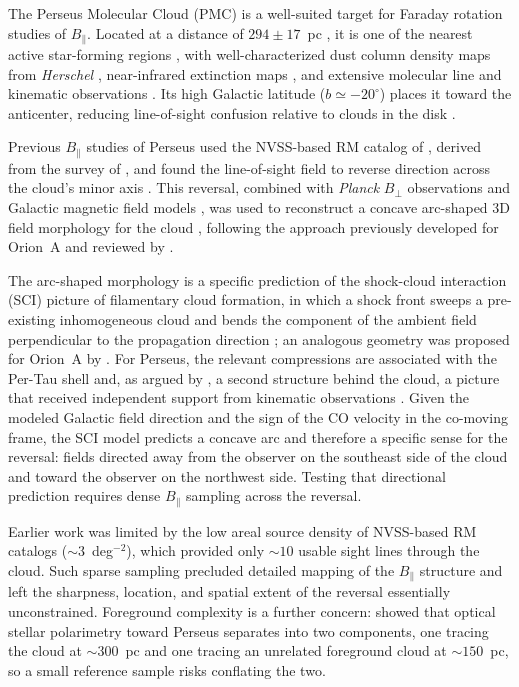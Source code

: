 \documentclass[twocolumn]{aastex701}
\begin{document}
The Perseus Molecular Cloud (PMC) is a well-suited target for Faraday
rotation studies of $B_\parallel$. Located at a distance of $294 \pm 17$~pc
\citep{zucker2018}, it is one of the nearest active star-forming regions
\citep{enoch2006bolocam,hatchell2007star,tobin2016vla}, with
well-characterized dust column density maps from \textit{Herschel}
\citep{andre2010}, near-infrared extinction maps
\citep{kainulainen2009,lombardi2009nicest}, and extensive molecular line and
kinematic observations
\citep{ridge2006complete,curtis2010submillimetre,chen2024filament,scibelli2024survey}.
Its high Galactic latitude ($b \simeq -20^\circ$) places it toward the
anticenter, reducing line-of-sight confusion relative to clouds in the disk
\citep{tahani2022b}.

Previous $B_\parallel$ studies of Perseus used the NVSS-based RM catalog of
\citet{taylor2009}, derived from the survey of \citet{condon1998nrao}, and
found the line-of-sight field to reverse direction across the cloud's minor
axis \citep{tahani2018}. This reversal, combined with \textit{Planck}
$B_\perp$ observations \citep{planck2016} and Galactic magnetic field models
\citep{jansson2012new}, was used to reconstruct a concave arc-shaped 3D field
morphology for the cloud \citep{tahani2022b}, following the approach
previously developed for Orion~A
\citep{tahani2019could,tahani2022orion} and reviewed by
\citet{tahani2022three}.

The arc-shaped morphology is a specific prediction of the shock-cloud
interaction (SCI) picture of filamentary cloud formation, in which a shock
front sweeps a pre-existing inhomogeneous cloud and bends the component of
the ambient field perpendicular to the propagation direction
\citep{inutsuka2015formation,inoue2018formation}; an analogous geometry was proposed
for Orion~A by \citet{heiles1997}. For Perseus, the relevant compressions are
associated with the Per-Tau shell \citep{bialy2021,doi2021two} and, as argued
by \citet{tahani2022b}, a second structure behind the cloud, a picture that
received independent support from kinematic observations
\citep{kounkel2022}. Given the modeled Galactic field direction and the sign
of the CO velocity in the co-moving  frame, the SCI model predicts
a concave arc and therefore a specific sense for the reversal: fields
directed away from the observer on the southeast side of the cloud and toward
the observer on the northwest side. Testing that directional prediction
requires dense $B_\parallel$ sampling across the reversal.

Earlier work was limited by the low areal source density of NVSS-based RM
catalogs ($\sim 3$~deg$^{-2}$), which provided only $\sim 10$ usable sight
lines through the cloud. Such sparse sampling precluded detailed mapping of
the $B_\parallel$ structure and left the sharpness, location, and spatial
extent of the reversal essentially unconstrained. Foreground complexity is a
further concern: \citet{doi2021two} showed that optical stellar polarimetry
toward Perseus separates into two components, one tracing the cloud at
$\sim 300$~pc and one tracing an unrelated foreground cloud at $\sim 150$~pc,
so a small reference sample risks conflating the two.
\end{document}
